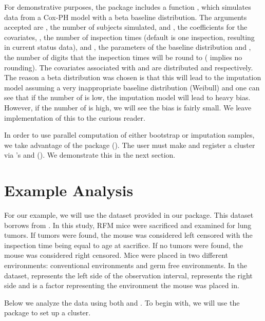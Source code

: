 \documentclass[article]{jss}
\begin{document}
{	For demonstrative purposes, the package includes a function , which simulates data from a Cox-PH model with a beta baseline distribution. The arguments accepted are , the number of subjects simulated,  and , the coefficients for the covariates, , the number of inspection times (default is one inspection, resulting in current status data),  and , the parameters of the baseline distribution and , the number of digits that the inspection times will be round to ( implies no rounding). The covariates associated with  and  are distributed  and  respectively. The reason a beta distribution was chosen is that this will lead to the imputation model assuming a very inappropriate baseline distribution (Weibull) and one can see that if the number of  is low, the imputation model will lead to heavy bias. However, if the number of  is high, we will see the bias is fairly small. We leave implementation of this to the curious reader. 
	
	In order to use parallel computation of either bootstrap or imputation samples, we take advantage of the  package (\cite{foreach}). The user must make and register a cluster via 's  and  (\cite{doParallel}). We demonstrate this in the next section. 
	
{\section{Example Analysis}}
	 For our example, we will use the dataset  provided in our package. This dataset borrows from \cite{mice_tumors}. In this study, RFM mice were sacrificed and examined for lung tumors. If tumors were found, the mouse was considered left censored with the inspection time being equal to age at sacrifice. If no tumors were found, the mouse was considered right censored. Mice were placed in two different environments: conventional environments and germ free environments. In the  dataset,  represents the left side of the observation interval,  represents the right side and  is a factor representing the environment the mouse was placed in. 

	Below we analyze the data using both  and . To begin with, we will use the package  to set up a cluster.

}
\end{document}
